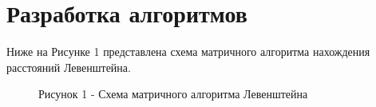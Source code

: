 \documentclass[12pt]{report}
\begin{document}


\section{Разработка алгоритмов}
Ниже на Рисунке 1 представлена схема матричного алгоритма нахождения расстояний Левенштейна.
\begin{figure}[h!]
	\caption*{Рисунок 1 - Схема матричного алгоритма Левенштейна}
\end{figure}

\restoregeometry
\end{document}
